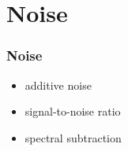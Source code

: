 
\section{Noise}

\begin{frame}
	\frametitle{Noise}
	\begin{itemize}
		\item additive noise
		\item signal-to-noise ratio
		\item spectral subtraction
	\end{itemize}
\end{frame}

